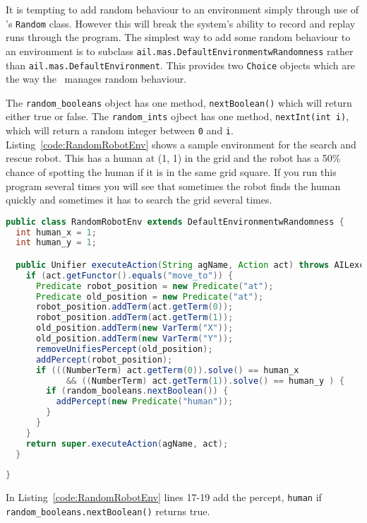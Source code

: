 \documentclass[a4]{article}
\begin{document}
It is tempting to add random behaviour to an environment simply through use of \java's \texttt{Random} class.  However this will break the system's ability to record and replay runs through the program.  The simplest way to add some random behaviour to an environment is to subclass \texttt{ail.mas.DefaultEnvironmentwRandomness} rather than \texttt{ail.mas.DefaultEnvironment}.  This provides two \texttt{Choice} objects which are the way the \ail\ manages random behaviour.

The \texttt{random\_booleans} object has one method, \texttt{nextBoolean()} which will return either true or false.  The \texttt{random\_ints} ojbect has one method, \texttt{nextInt(int i)}, which will return a random integer between \texttt{0} and \texttt{i}.  Listing~\ref{code:RandomRobotEnv} shows a sample environment for the search and rescue robot.  This has a human at (1, 1) in the grid and the robot has a 50\% chance of spotting the human if it is in the same grid square.   If you run this program several times you will see that sometimes the robot finds the human quickly and sometimes it has to search the grid several times.

\begin{lstlisting}[float,caption=RandomRobotEnv,basicstyle=\sffamily,language=Java,style=easslisting,label=code:RandomRobotEnv]
public class RandomRobotEnv extends DefaultEnvironmentwRandomness {
  int human_x = 1;
  int human_y = 1;

  public Unifier executeAction(String agName, Action act) throws AILexception {
    if (act.getFunctor().equals("move_to")) {
      Predicate robot_position = new Predicate("at");
      Predicate old_position = new Predicate("at");
      robot_position.addTerm(act.getTerm(0));
      robot_position.addTerm(act.getTerm(1));
      old_position.addTerm(new VarTerm("X"));
      old_position.addTerm(new VarTerm("Y"));
      removeUnifiesPercept(old_position);
      addPercept(robot_position);
      if (((NumberTerm) act.getTerm(0)).solve() == human_x 
            && ((NumberTerm) act.getTerm(1)).solve() == human_y ) {
        if (random_booleans.nextBoolean()) {
          addPercept(new Predicate("human"));
        }
      }
    }
    return super.executeAction(agName, act);
  }
	      
}
\end{lstlisting}

In Listing~\ref{code:RandomRobotEnv} lines 17-19 add the percept, \lstinline{human} if \texttt{random\_booleans.nextBoolean()} returns true.
\end{document}
